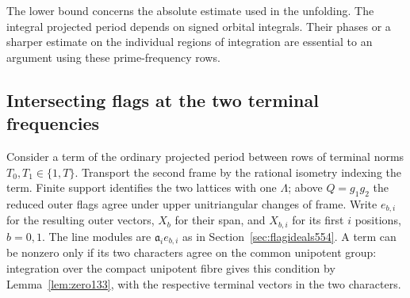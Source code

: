 \documentclass[a4paper,11pt]{article}
\theoremstyle{definition}
\theoremstyle{remark}
\numberwithin{equation}{section}
\begin{document}
The lower bound concerns the absolute estimate used in the
unfolding. The integral projected period depends on signed
orbital integrals. Their phases or a sharper estimate on the
individual regions of integration are essential to an argument
using these prime-frequency rows.


\subsection{Intersecting flags at the two terminal frequencies}
\label{sec:mixedsuffix556}

Consider a term of the ordinary projected period between rows
of terminal norms \(T_0,T_1\in\{1,T\}\). Transport the second
frame by the rational isometry indexing the term. Finite
support identifies the two lattices with one \(\Lambda\);
above \(Q=g_1g_2\) the reduced outer flags agree under upper
unitriangular changes of frame. Write \(e_{b,i}\) for the
resulting outer vectors, \(X_b\) for their span, and
\(X_{b,i}\) for its first \(i\) positions, \(b=0,1\).
The line modules are \(\mathfrak a_i e_{b,i}\) as in
Section~\ref{sec:flagideals554}. A term can be nonzero only
if its two characters agree on the common unipotent group:
integration over the compact unipotent fibre gives this condition
by Lemma~\ref{lem:zero133}, with the respective terminal
vectors in the two characters.
\end{document}
